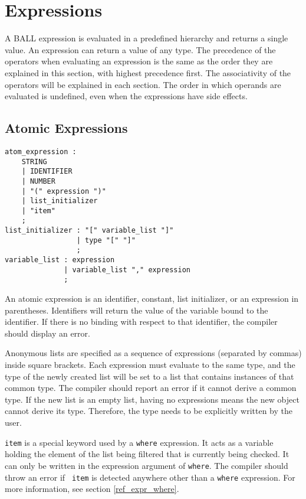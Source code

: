 
\section{Expressions}
A BALL expression is evaluated in a predefined hierarchy and returns a
single value. An expression can return a value of any type. The
precedence of the operators when evaluating an expression is the same
as the order they are explained in this section, with highest
precedence first. The associativity of the operators will be explained
in each section. The order in which operands are evaluated is
undefined, even when the expressions have side effects.

\subsection{Atomic Expressions}
\begin{verbatim}
atom_expression : 
    STRING
    | IDENTIFIER
    | NUMBER
    | "(" expression ")"
    | list_initializer
    | "item"
    ;
list_initializer : "[" variable_list "]"
                 | type "[" "]"
                 ;
variable_list : expression
              | variable_list "," expression
              ;
\end{verbatim} 

An atomic expression is an identifier, constant, list initializer, or
an expression in parentheses. Identifiers will return the value of the
variable bound to the identifier. If there is no binding with respect
to that identifier, the compiler should display an error.

Anonymous lists are specified as a sequence of expressions (separated
by commas) inside square brackets. Each expression must evaluate to
the same type, and the type of the newly created list will be set to a
list that contains instances of that common type. The compiler should
report an error if it cannot derive a common type. If the new list is
an empty list, having no expressions means the new object cannot
derive its type. Therefore, the type needs to be explicitly written by
the user.

{\tt item} is a special keyword used by a {\tt where} expression. It
acts as a variable holding the element of the list being filtered that
is currently being checked. It can only be written in the expression
argument of {\tt where}. The compiler should throw an error if {\tt
  item} is detected anywhere other than a {\tt where} expression. For
more information, see section \ref{ref_expr_where}.


